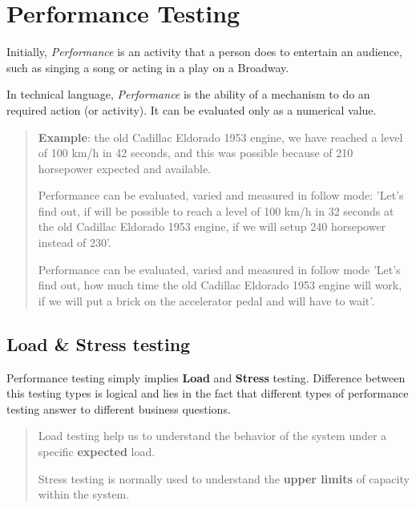 \section{Performance Testing}
\label{sec:Performance Testing}

Initially, \emph{Performance} is an activity that a person does to entertain an audience, such as singing a song or acting in a play on a Broadway.

In technical language, \emph{Performance} is the ability of a mechanism to do an required action (or activity). It can be evaluated only as a numerical value.

\begin{quote}
\textbf{Example}: the old Cadillac Eldorado 1953 engine, we have reached a level of 100 km/h in 42 seconds, and this was possible because of 210 horsepower expected and available.

Performance can be evaluated, varied and measured in follow mode: 'Let's find out, if will be possible to reach a level of 100 km/h in 32 seconds at the old Cadillac Eldorado 1953 engine, if we will setup 240 horsepower instead of 230'.

Performance can be evaluated, varied and measured in follow mode 'Let's find out, how much time the old Cadillac Eldorado 1953 engine will work, if we will put a brick on the accelerator pedal and will have to wait'.
\end{quote} 

\subsection{Load \& Stress testing}
\label{sec:Load and Stress testing}

Performance testing simply implies \textbf{Load} and \textbf{Stress} testing. Difference between this testing types is logical and lies in the fact that different types of performance testing answer to different business questions.

\begin{quote}
Load testing help us to understand the behavior of the system under a specific \textbf{expected} load.

Stress testing is normally used to understand the \textbf{upper limits} of capacity within the system.                                                                                             \end{quote} 

